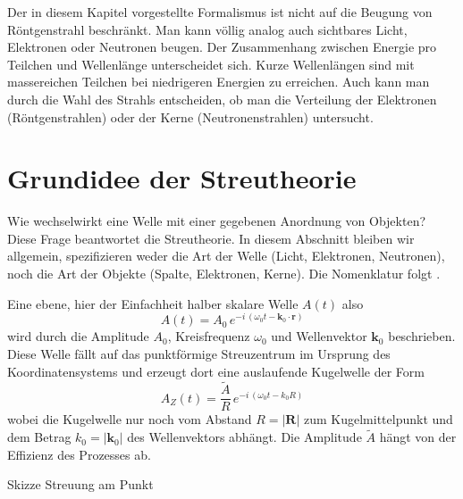 Der in diesem Kapitel vorgestellte Formalismus ist nicht auf die Beugung von Röntgenstrahl beschränkt. Man kann völlig analog auch sichtbares Licht, Elektronen oder Neutronen beugen. Der Zusammenhang zwischen Energie pro Teilchen und Wellenlänge unterscheidet sich. Kurze Wellenlängen sind mit massereichen Teilchen bei niedrigeren Energien zu erreichen.  Auch kann man durch die Wahl des Strahls entscheiden, ob man die Verteilung der Elektronen (Röntgenstrahlen) oder der Kerne (Neutronenstrahlen) untersucht. 


\section{Grundidee der Streutheorie}

Wie wechselwirkt eine Welle mit einer gegebenen Anordnung von Objekten? Diese Frage beantwortet die Streutheorie. In diesem Abschnitt bleiben wir allgemein, spezifizieren weder die Art der Welle (Licht, Elektronen, Neutronen), noch die Art der Objekte (Spalte, Elektronen, Kerne). Die Nomenklatur folgt \cite{Hunklinger2014}.

Eine ebene, hier der Einfachheit halber skalare Welle $A(t)$ also
\begin{equation}
 A(t) = A_0 \, e^{- i \, (\omega_0 t - \mathbf{k}_0 \cdot \mathbf{r})}
\end{equation}
wird durch die Amplitude $A_0$, Kreisfrequenz $\omega_0$ und Wellenvektor $\mathbf{k}_0$ beschrieben. Diese Welle fällt auf das punktförmige Streuzentrum im Ursprung des Koordinatensystems und erzeugt dort eine auslaufende Kugelwelle der Form
\begin{equation}
 A_Z(t) = \frac{\tilde{A}}{R} \,  e^{- i \, (\omega_0 t - k_0 R)}
\end{equation}
wobei  die Kugelwelle nur noch vom Abstand $R = |\mathbf{R}|$ zum Kugelmittelpunkt und dem Betrag $k_0 = | \mathbf{k}_0| $ des Wellenvektors abhängt. Die Amplitude $\tilde{A}$ hängt von der Effizienz des Prozesses ab.

\begin{marginfigure}
\caption{Skizze Streuung am Punkt}
\end{marginfigure}

